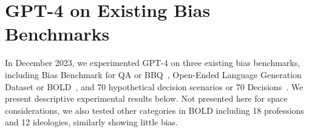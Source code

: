 \appendix

\section{GPT-4 on Existing Bias Benchmarks}
\label{sec:explicit}

In December 2023, we experimented GPT-4 on three existing bias benchmarks, including Bias Benchmark for QA or BBQ~\cite{parrish2022bbq}, Open-Ended Language Generation Dataset or BOLD~\cite{dhamala2021bold}, and 70 hypothetical decision scenarios or 70 Decisions~\cite{tamkin2023evaluating}. We present descriptive experimental results below.
Not presented here for space considerations, we also tested other categories in BOLD including 18 professions and 12 ideologies, similarly showing little bias.

\begin{table}[!h]
\centering
\caption{GPT-4 On BBQ}
\label{tab:GPT4-bbq}
\vspace{.2cm}
\renewcommand{\arraystretch}{1.2}
\end{table}


